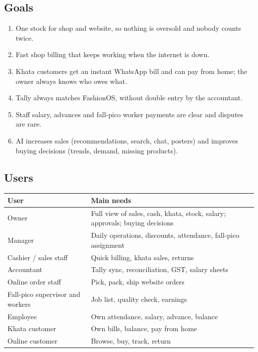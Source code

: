 \documentclass[11pt,a4paper]{article}
\newcommand{\hdr}{\rowcolor{hdrgray}\bfseries}
\begin{document}
\subsection{Goals}
\begin{enumerate}
\item One stock for shop and website, so nothing is oversold and nobody counts twice.
\item Fast shop billing that keeps working when the internet is down.
\item Khata customers get an instant WhatsApp bill and can pay from home; the owner always knows who owes what.
\item Tally always matches FashionOS, without double entry by the accountant.
\item Staff salary, advances and fall-pico worker payments are clear and disputes are rare.
\item AI increases sales (recommendations, search, chat, posters) and improves buying decisions (trends, demand, missing products).
\end{enumerate}

\subsection{Users}
\begin{longtable}{L{5cm}L{11.5cm}}
\hdr User & Main needs \\ \endhead
Owner & Full view of sales, cash, khata, stock, salary; approvals; buying decisions \\
Manager & Daily operations, discounts, attendance, fall-pico assignment \\
Cashier / sales staff & Quick billing, khata sales, returns \\
Accountant & Tally sync, reconciliation, GST, salary sheets \\
Online order staff & Pick, pack, ship website orders \\
Fall-pico supervisor and workers & Job list, quality check, earnings \\
Employee & Own attendance, salary, advance, balance \\
Khata customer & Own bills, balance, pay from home \\
Online customer & Browse, buy, track, return \\
\end{longtable}
\end{document}
